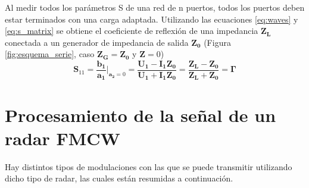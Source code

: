 Al medir todos los parámetros S de una red de n puertos, todos los puertos deben estar terminados con una carga adaptada. Utilizando las ecuaciones \ref{eq:waves} y \ref{eq:s_matrix} se obtiene el coeficiente de reflexión de una impedancia $\bm{Z_L}$ conectada a un generador de impedancia de salida $\bm{Z_0}$ (Figura \ref{fig:esquema_serie}, caso $\bm{Z_G} = \bm{Z_0}$ y $\bm{Z} = 0$)
\begin{equation}
\bm{S}_{11} = \dfrac{\bm{b_1}}{\bm{a_1}}\bigg|_{\bm{a_2}=0} = \dfrac{\bm{U_1} - \bm{I_1}\bm{Z_0}}{\bm{U_1} + \bm{I_1}\bm{Z_0}} = \dfrac{\bm{Z_L} - \bm{Z_0}}{\bm{Z_L} + \bm{Z_0}} = \bm{\Gamma}
\end{equation}


\section{Procesamiento de la señal de un radar FMCW}

Hay distintos tipos de modulaciones con las que se puede transmitir utilizando dicho tipo de radar, las cuales están resumidas a continuación.

